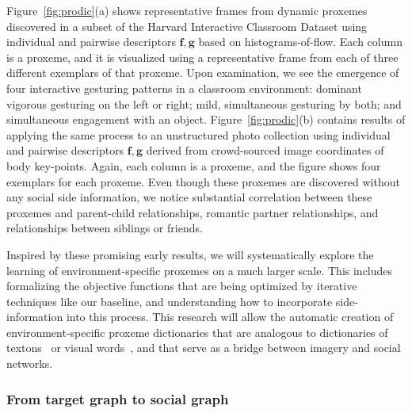Figure~\ref{fig:prodic}(a) shows representative frames from dynamic proxemes discovered in a subset of the Harvard Interactive Classroom Dataset using individual and pairwise descriptors $\mathbf{f},\mathbf{g}$ based on histograms-of-flow. Each column is a proxeme, and it is visualized using a representative frame from each of three different exemplars of that proxeme. Upon examination, we see the emergence of four  interactive gesturing patterns in a classroom environment: dominant vigorous gesturing on the left or right; mild, simultaneous gesturing by both; and simultaneous engagement with an object. Figure~\ref{fig:prodic}(b) contains results of applying the same process to an unstructured photo collection using individual and pairwise descriptors $\mathbf{f},\mathbf{g}$ derived from crowd-sourced image coordinates of body key-points. Again, each column is a proxeme, and the figure shows four exemplars for each proxeme. Even though these proxemes are discovered without any social side information, we notice substantial correlation between these proxemes and parent-child relationships, romantic partner relationships, and relationships between siblings or friends. 

Inspired by these promising early results, we will systematically explore the learning of environment-specific proxemes on a much larger scale. This includes formalizing the objective functions that are being optimized by iterative techniques like our baseline, and understanding how to incorporate side-information into this process. This research will allow the automatic creation of environment-specific proxeme dictionaries that are analogous to dictionaries of textons~\cite{leung2001representing} or visual words~\cite{grauman2005pyramid,lazebnik2006beyond}, and that serve as a bridge between imagery and social networks.




\subsubsection{From target graph to social graph}




